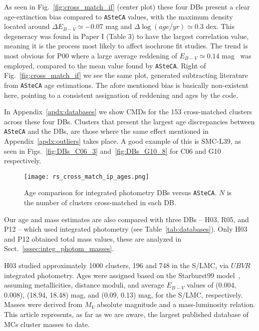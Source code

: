 \documentclass{aa}
\begin{document}
As seen in Fig.~\ref{fig:cross_match_if} (center plot) these four DBs
present a clear age-extinction bias compared to \texttt{ASteCA} values, with the
maximum density located around $\Delta E_{B-V}{\simeq-}0.07$ mag and
$\Delta\log(age/yr){\simeq}0.3$ dex.
This degeneracy was found in Paper I (Table 3) to have the largest
correlation value, meaning it is the process most likely to affect isochrone fit
studies.
The trend is most obvious for P00 where a large average reddening of
$E_{B-V}{\simeq}0.14$ mag~\citep{de_Grijs_2006} was employed, compared to the
mean value found by \texttt{ASteCA}.
%
Right of Fig.~\ref{fig:cross_match_if} we see the same plot,
generated subtracting literature from \texttt{ASteCA} age estimations.
The afore mentioned bias is basically non-existent here, pointing to a
consistent assignation of reddening and ages by the code.

In Appendix~\ref{apdx:databases} we show CMDs for the 153 cross-matched
clusters across these four DBs.
Clusters that present the largest age discrepancies between
\texttt{ASteCA} and the DBs, are those where the same effect mentioned in
Appendix~\ref{apdx:outliers} takes place. A good example of this is SMC-L39, as
seen in Figs.~\ref{fig:DBs_C06_3} and~\ref{fig:DBs_G10_8} for C06 and G10
respectively.\\


%

\begin{figure}
\centering
\texttt{[image: rs\_cross\_match\_ip\_ages.png]}
\caption{Age comparison for integrated photometry DBs versus \texttt{ASteCA}.
$N$ is the number of clusters cross-matched in each DB.\@}
\label{fig:cross_match_ip_age}
\end{figure}

Our age and mass estimates are also compared with three DBs -- H03, R05, and P12
-- which used integrated photometry (see Table~\ref{tab:databases}). Only H03
and P12 obtained total mass values, these are analyzed in
Sect.~\ref{sssec:integ_photom_masses}.

H03 studied approximately 1000 clusters, 196 and 748 in the S/LMC, via $UBVR$
integrated photometry.
Ages were assigned based on the Starburst99
model~\citep{Leitherer_1999}, assuming metallicities, distance moduli, and
average $E_{B-V}$ values of (0.004, 0.008), (18.94, 18.48) mag, and 
(0.09, 0.13) mag, for the S/LMC, respectively.
%
Masses were derived from $M_V$ absolute magnitude and a mass-luminosity
relation.
This article represents, as far as we are aware, the largest published database
of MCs cluster masses to date.
\end{document}
